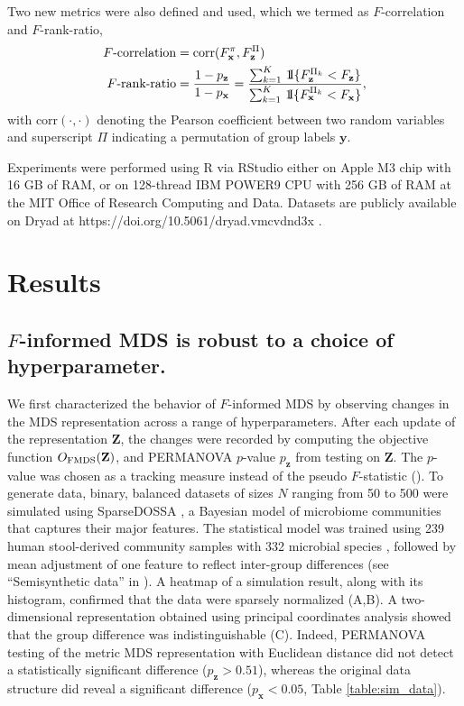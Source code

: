 \documentclass[10pt,letterpaper]{article}
\newcommand{\1}{{\rm 1}\kern-0.24em{\rm I}}
\begin{document}
Two new metrics were also defined and used, which we termed as $F$-correlation and $F$-rank-ratio,
\begin{equation}
\begin{aligned}
    F\text{-correlation} &= \text{corr}(F_\mathbf{x}^\pi, F_\mathbf{z}^\Pi) \\
    F\text{-rank-ratio} &= \frac{1-p_\mathbf{z}}{1-p_\mathbf{x}} = \frac{\sum_{k=1}^K\,\1\{F_\mathbf{z}^{\Pi_k} < F_\mathbf{z}\}}{\sum_{k=1}^K\,\1\{F_\mathbf{x}^{\Pi_k} < F_\mathbf{x}\}},
    \label{eq:def_f_metrics}
\end{aligned}
\end{equation}
with $\text{corr}(\cdot,\cdot)$ denoting the Pearson coefficient between two random variables and superscript $\Pi$ indicating a permutation of group labels $\mathbf{y}$.

Experiments were performed using R via RStudio either on Apple M3 chip with 16 GB of RAM, or on 128-thread IBM POWER9 CPU with 256 GB of RAM at the MIT Office of Research Computing and Data.
Datasets are publicly available on Dryad at https://doi.org/10.5061/dryad.vmcvdnd3x \cite{Kim25}.



\section*{Results}
\subsection*{$F$-informed MDS is robust to a choice of hyperparameter.}
We first characterized the behavior of $F$-informed MDS by observing changes in the MDS representation across a range of hyperparameters. After each update of the representation $\mathbf{Z}$, the changes were recorded by computing the objective function $O_{\rm FMDS}(\mathbf{Z})$, and PERMANOVA $p$-value $p_\mathbf{z}$ from testing on $\mathbf{Z}$. The $p$-value was chosen as a tracking measure instead of the pseudo $F$-statistic (). To generate data, binary, balanced datasets of sizes $N$ ranging from 50 to 500 were simulated using SparseDOSSA \cite{Ma21}, a Bayesian model of microbiome communities that captures their major features. The statistical model was trained using 239 human stool-derived community samples with 332 microbial species \cite{Lloyd17}, followed by mean adjustment of one feature to reflect inter-group differences (see ``Semisynthetic data'' in ). A heatmap of a simulation result, along with its histogram, confirmed that the data were sparsely normalized (A,B). A two-dimensional representation obtained using principal coordinates analysis showed that the group difference was indistinguishable (C). Indeed, PERMANOVA testing of the metric MDS representation with Euclidean distance did not detect a statistically significant difference ($p_\mathbf{z}>0.51$), whereas the original data structure did reveal a significant difference ($p_\mathbf{x}<0.05$, Table \ref{table:sim_data}).
\end{document}
